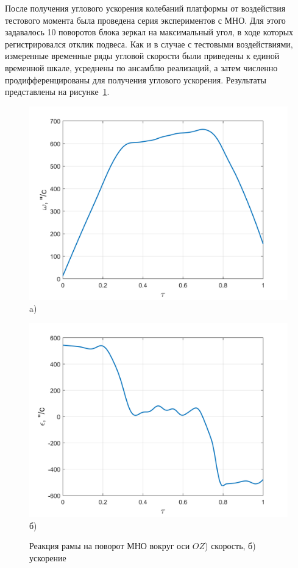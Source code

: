 После получения углового ускорения колебаний платформы от воздействия тестового момента была проведена серия экспериментов с МНО. Для этого задавалось 10 поворотов блока зеркал на максимальный угол, в ходе которых регистрировался отклик подвеса. Как и в случае с тестовыми воздействиями, измеренные временные ряды угловой скорости были приведены к единой временной шкале, усреднены по ансамблю реализаций, а затем численно продифференцированы для получения углового ускорения. Результаты представлены на рисунке~\cref{fig:oz-gyro}.

\begin{figure}[!h]
	\begin{minipage}[b][][b]{0.49\linewidth}\centering
		\includegraphics[width=0.9\linewidth]{matlab/img/oz-gyro.png} \\ a)
	\end{minipage}
	\hfill
	\begin{minipage}[b][][b]{0.49\linewidth}\centering
		\includegraphics[width=0.9\linewidth]{matlab/img/oz-gyro-acc.png} \\ б)
	\end{minipage}
	\caption{Реакция рамы на поворот МНО вокруг оси $OZ$) скорость, б) ускорение }
	\label{fig:oz-gyro}
\end{figure}

